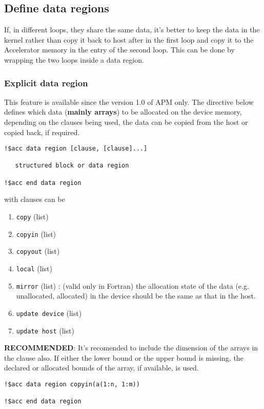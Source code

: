 \subsection{Define data regions}
\label{sec:define-data-regions}

If, in different loops, they share the same data, it's better to keep
the data in the kernel rather than copy it back to host after in the
first loop and copy it to the Accelerator memory in the entry of the
second loop. This can be done by wrapping the two loops inside a data
region. 

\subsubsection{Explicit data region}
\label{sec:explicit-data-region}

This feature is available since the version 1.0 of APM only. The
directive below defines which data ({\bf mainly arrays}) to be
allocated on the device memory, depending on the clauses being used,
the data can be copied from the host or copied back, if required.

\begin{lstlisting}
!$acc data region [clause, [clause]...]

   structured block or data region

!$acc end data region
\end{lstlisting}
with clauses can be 
\begin{enumerate}
\item \verb!copy! (list)
\item \verb!copyin! (list)
\item \verb!copyout! (list)
\item \verb!local! (list)
\item \verb!mirror! (list) : (valid only in Fortran) the allocation
  state of the data (e.g. unallocated, allocated) in the device should
  be the same as that in the host. 

\item \verb!update device! (list)
\item \verb!update host! (list)
\end{enumerate}

{\bf RECOMMENDED}: It's recomended to include the dimension of the
arrays in the clause also. If either the lower bound or the upper
bound is missing, the declared or allocated bounds of the array, if
available, is used.

\begin{lstlisting}
!$acc data region copyin(a(1:n, 1:m))

!$acc end data region
\end{lstlisting}

